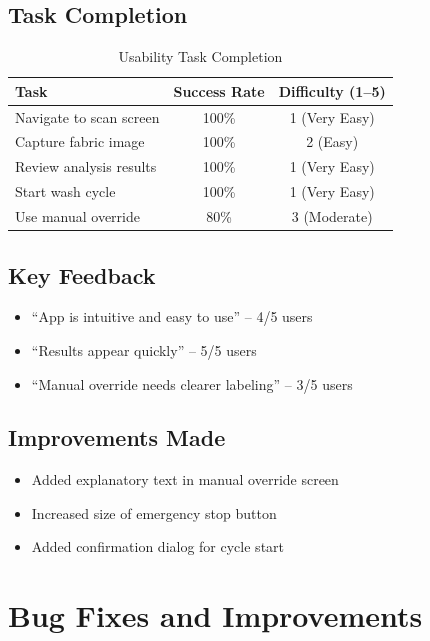 \subsection{Task Completion}
\begin{table}[H]
    \centering
    \begin{tabular}{|l|c|c|}
        \hline
        \textbf{Task} & \textbf{Success Rate} & \textbf{Difficulty (1–5)} \\
        \hline
        Navigate to scan screen & 100\% & 1 (Very Easy) \\
        \hline
        Capture fabric image & 100\% & 2 (Easy) \\
        \hline
        Review analysis results & 100\% & 1 (Very Easy) \\
        \hline
        Start wash cycle & 100\% & 1 (Very Easy) \\
        \hline
        Use manual override & 80\%  & 3 (Moderate) \\
        \hline
    \end{tabular}
    \caption{Usability Task Completion}
    \label{tab:usability}
\end{table}

\subsection{Key Feedback}
\begin{itemize}
    \item “App is intuitive and easy to use” – 4/5 users
    \item “Results appear quickly” – 5/5 users
    \item “Manual override needs clearer labeling” – 3/5 users
\end{itemize}

\subsection{Improvements Made}
\begin{itemize}
    \item Added explanatory text in manual override screen
    \item Increased size of emergency stop button
    \item Added confirmation dialog for cycle start
\end{itemize}

\section{Bug Fixes and Improvements}

